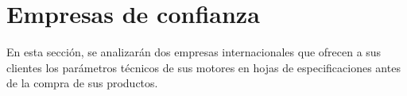 
\section{Empresas de confianza}

    \noindent
    En esta sección, se analizarán dos empresas internacionales que ofrecen a sus clientes los parámetros técnicos de sus motores en hojas de especificaciones antes de la compra de sus productos.
